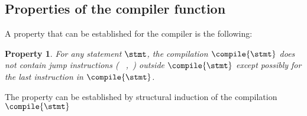 \subsection{Properties of the compiler function}

A property that can be established for the compiler is the following: 

\newtheorem{compProp1}{Property} 

\begin{compProp1}
  For any statement $\stmt$, the compilation $\compile{\stmt}$ does not contain jump instructions ( \mbox{ \rm {},  }) outside $\compile{\stmt}$ except possibly for the last
instruction in  $\compile{\stmt}$.
\end{compProp1}
The property can be established by structural induction of the compilation $\compile{\stmt}$




